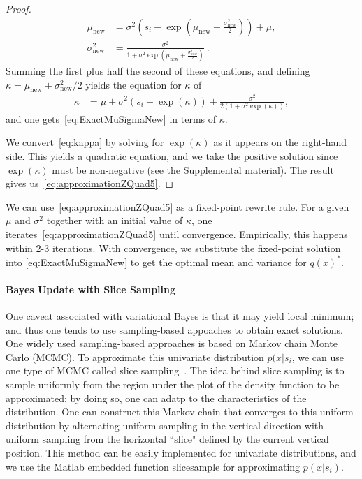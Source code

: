 \begin{proof}
%
\begin{align}
    \mu_{\text{new}} & = \sigma^{2}\left(s_i - \exp\left(\mu_{\text{new}}+\frac{\sigma_{\text{new}}^2}{2}\right)\right) + \mu, \nonumber \\
   \sigma_{\text{new}}^2 & = \frac{\sigma^2}{1+\sigma^2 \exp(\mu_{\text{new}}+\frac{\sigma_{new}^2}{2})}~.\nonumber
\end{align}
Summing the first plus half the second of these equations,
and defining $\kappa=\mu_{\text{new}}+\sigma_{\text{new}}^2/2$
yields the equation for $\kappa$ of
\begin{align}\label{eq:kappa}
    \kappa & = \mu + \sigma^2(s_i - \exp(\kappa)) + \frac{\sigma^2}{2(1+\sigma^2\exp(\kappa))},
\end{align}
and one gets~\eqref{eq:ExactMuSigmaNew} in terms of $\kappa$.

We convert~\eqref{eq:kappa} by solving for $\exp(\kappa)$
as it appears on the right-hand side.  This yields
a quadratic equation, and we take the positive solution since $\exp(\kappa)$
must be non-negative (see the Supplemental material).
The result gives us~\eqref{eq:approximationZQuad5}.
\end{proof}

We can use~\eqref{eq:approximationZQuad5}
as a fixed-point rewrite rule.
For a given $\mu$ and $\sigma^2$ together with an initial value of
$\kappa$, one iterates~\eqref{eq:approximationZQuad5} until
convergence.  Empirically, this happens within 2-3 iterations.
With convergence, we substitute the fixed-point solution
into \eqref{eq:ExactMuSigmaNew} to get the optimal mean
and variance for $q(x)^*$.

\paragraph{\bf Bayes Update with Slice Sampling}
One caveat associated with variational Bayes is that it may yield local minimum; and thus one tends to use sampling-based appoaches to obtain exact solutions. One widely used sampling-based approaches is based on Markov chain Monte Carlo (MCMC). To approximate this univariate distribution $p(x|s_i$, we can use one type of MCMC called slice sampling~\cite{neal03SliceSampling}. The idea behind slice sampling is to sample uniformly from the region under the plot of the density function to be approximated; by doing so, one can adatp to the characteristics of the distribution. One can construct this Markov chain that converges to this uniform distribution by alternating uniform sampling in the vertical direction with uniform sampling from the horizontal ``slice" defined by the current vertical position. This method can be easily implemented for univariate distributions, and we use the Matlab embedded function slicesample for approximating $p(x|s_i)$. 


